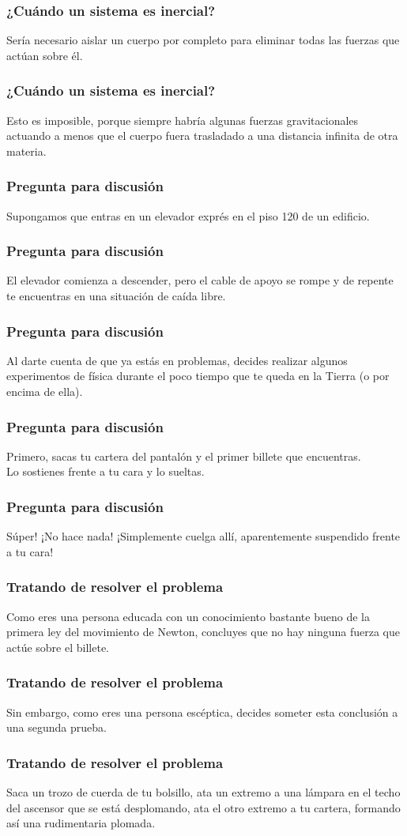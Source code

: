 \documentclass[12pt]{beamer}
\begin{document}
\begin{frame}
\frametitle{¿Cuándo un sistema es inercial?}
Sería necesario aislar un cuerpo por completo para eliminar todas las fuerzas que actúan sobre él.
\end{frame}
\begin{frame}
\frametitle{¿Cuándo un sistema es inercial?}
Esto es imposible, porque siempre habría algunas fuerzas gravitacionales actuando a menos que el cuerpo fuera trasladado a una distancia infinita de otra materia.
\end{frame}
\begin{frame}
\frametitle{Pregunta para discusión}
Supongamos que entras en un elevador exprés en el piso 120 de un edificio.
\end{frame}
\begin{frame}
\frametitle{Pregunta para discusión}
El elevador comienza a descender, pero el cable de apoyo se rompe y de repente te encuentras en una situación de caída libre.
\end{frame}
\begin{frame}
\frametitle{Pregunta para discusión}
Al darte cuenta de que ya estás en problemas, \pause decides realizar algunos experimentos de física durante el poco tiempo que te queda en la Tierra (o por encima de ella).
\end{frame}
\begin{frame}
\frametitle{Pregunta para discusión}
Primero, \pause sacas tu cartera del pantalón y el primer billete que encuentras.
\\
\bigskip
\pause
Lo sostienes frente a tu cara y lo sueltas.
\end{frame}
\begin{frame}
\frametitle{Pregunta para discusión}
Súper! \pause ¡No hace nada! \pause ¡Simplemente cuelga allí, aparentemente suspendido frente a tu cara!
\end{frame}
\begin{frame}
\frametitle{Tratando de resolver el problema}
Como eres una persona educada con un conocimiento bastante bueno de la primera ley del movimiento de Newton, concluyes que no hay ninguna fuerza que actúe sobre el billete.
\end{frame}
\begin{frame}
\frametitle{Tratando de resolver el problema}
Sin embargo, como eres una persona escéptica, \pause decides someter esta conclusión a una segunda prueba.
\end{frame}
\begin{frame}
\frametitle{Tratando de resolver el problema}
Saca un trozo de cuerda de tu bolsillo, ata un extremo a una lámpara en el techo del ascensor que se está desplomando, \pause ata el otro extremo a tu cartera, formando así una rudimentaria plomada.
\end{frame}
\end{document}
